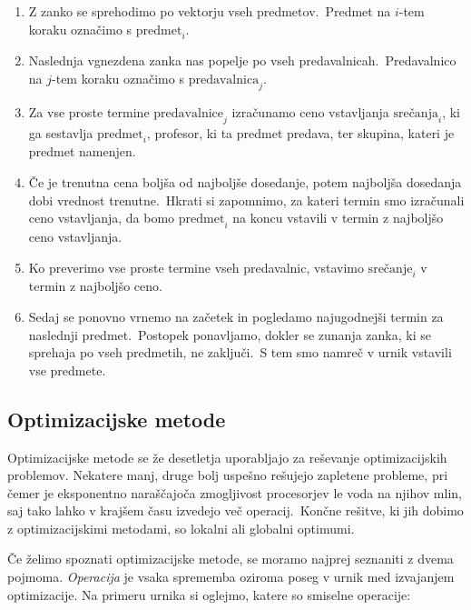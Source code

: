 \documentclass[a4paper]{article}
\begin{document}
\begin{enumerate}
	\item Z zanko se sprehodimo po vektorju vseh predmetov.\ Predmet na $i$-tem koraku
   označimo s $\mathrm{predmet}_i$.

   \item Naslednja vgnezdena zanka nas popelje po vseh predavalnicah.\ Predavalnico na
   $j$-tem koraku označimo s $\mathrm{predavalnica}_j$.

   \item Za vse proste termine $\mathrm{predavalnice}_j$ izračunamo ceno vstavljanja
   $\mathrm{srečanja}_i$, ki ga sestavlja $\mathrm{predmet}_i$, profesor, ki ta predmet predava,
   ter skupina, kateri je predmet namenjen.

   \item Če je trenutna cena boljša od najboljše dosedanje, potem najboljša dosedanja
   dobi vrednost trenutne.\ Hkrati si zapomnimo, za kateri termin smo izračunali ceno
   vstavljanja, da bomo $\mathrm{predmet}_i$ na koncu vstavili v termin z najboljšo
   ceno vstavljanja.

   \item Ko preverimo vse proste termine vseh predavalnic, vstavimo $\mathrm{srečanje}_i$
   v termin z najboljšo ceno.

   \item Sedaj se ponovno vrnemo na začetek in pogledamo najugodnejši termin za naslednji
   predmet.\ Postopek ponavljamo, dokler se zunanja zanka, ki se sprehaja po vseh predmetih,
   ne zaključi.\ S tem smo namreč v urnik vstavili vse predmete.
\end{enumerate}

\subsection{Optimizacijske metode} %

Optimizacijske metode se že desetletja uporabljajo za reševanje optimizacijskih problemov.
Nekatere manj, druge bolj uspešno rešujejo zapletene probleme, pri čemer je eksponentno
naraščajoča zmogljivost procesorjev le voda na njihov mlin, saj tako lahko v krajšem
času izvedejo več operacij.\ Končne rešitve, ki jih dobimo z optimizacijskimi metodami,
so lokalni ali globalni optimumi.

Če želimo spoznati optimizacijske metode, se moramo najprej seznaniti z dvema pojmoma.
\emph{Operacija} je vsaka sprememba oziroma poseg v urnik med izvajanjem optimizacije.
Na primeru urnika si oglejmo, katere so smiselne operacije:
\end{document}
